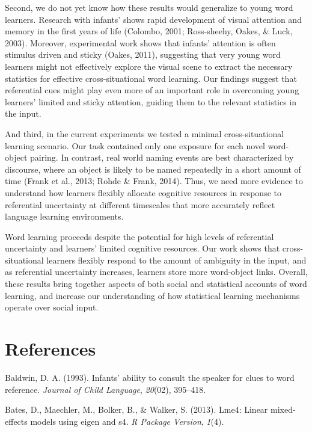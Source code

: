 \documentclass[a4paper,man,natbib]{apa6}
\begin{document}
Second, we do not yet know how these results would generalize to young
word learners. Research with infants' shows rapid development of visual
attention and memory in the first years of life (Colombo, 2001;
Ross-sheehy, Oakes, \& Luck, 2003). Moreover, experimental work shows
that infants' attention is often stimulus driven and sticky (Oakes,
2011), suggesting that very young word learners might not effectively
explore the visual scene to extract the necessary statistics for
effective cross-situational word learning. Our findings suggest that
referential cues might play even more of an important role in overcoming
young learners' limited and sticky attention, guiding them to the
relevant statistics in the input.

And third, in the current experiments we tested a minimal
cross-situational learning scenario. Our task contained only one
exposure for each novel word-object pairing. In contrast, real world
naming events are best characterized by discourse, where an object is
likely to be named repeatedly in a short amount of time (Frank et al.,
2013; Rohde \& Frank, 2014). Thus, we need more evidence to understand
how learners flexibly allocate cognitive resources in response to
referential uncertainty at different timescales that more accurately
reflect language learning environments.

Word learning proceeds despite the potential for high levels of
referential uncertainty and learners' limited cognitive resources. Our
work shows that cross-situational learners flexibly respond to the
amount of ambiguity in the input, and as referential uncertainty
increases, learners store more word-object links. Overall, these results
bring together aspects of both social and statistical accounts of word
learning, and increase our understanding of how statistical learning
mechanisms operate over social input.

\newpage

\section*{References}\label{references}

Baldwin, D. A. (1993). Infants' ability to consult the speaker for clues
to word reference. \emph{Journal of Child Language}, \emph{20}(02),
395--418.

Bates, D., Maechler, M., Bolker, B., \& Walker, S. (2013). Lme4: Linear
mixed-effects models using eigen and s4. \emph{R Package Version},
\emph{1}(4).
\end{document}
